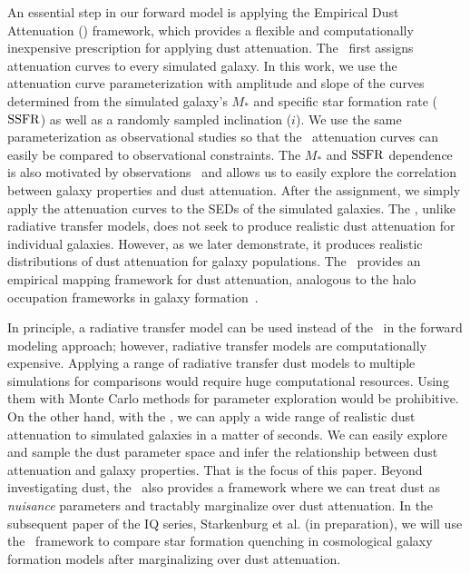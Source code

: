 An essential step in our forward model is applying the Empirical Dust
Attenuation (\eda) framework, which provides a flexible and computationally
inexpensive prescription for applying dust attenuation.  
The \eda~first assigns attenuation curves to every simulated galaxy. 
In this work, we use the \cite{noll2009} attenuation curve parameterization
with amplitude and slope of the curves determined from
the simulated galaxy's $M_*$ and specific star formation
rate (${\rm SSFR}$) as well as a randomly sampled inclination ($i$). 
We use the same parameterization as observational studies so that the
\eda~attenuation curves can easily be compared to observational constraints. 
The $M_*$ and ${\rm SSFR}$ dependence is also motivated by
observations~\citep[\eg~][]{garn2010, wild2011, battisti2016, leja2017,
salim2018, salim2020} and allows us to easily explore the correlation
between galaxy properties and dust attenuation.
After the assignment, we simply apply the attenuation curves to the SEDs of
the simulated galaxies.
The \eda, unlike radiative transfer models, does not seek to produce realistic
dust attenuation for individual galaxies. 
However, as we later demonstrate, it produces realistic distributions of
dust attenuation for galaxy populations. 
The \eda~provides an empirical mapping framework for dust attenuation,
analogous to the halo occupation frameworks in galaxy formation~\citep[for a
review see ][]{wechsler2018}. 

In principle, a radiative transfer model can be used instead of the \eda~in
the forward modeling approach; however, radiative transfer models are computationally expensive.  
Applying a range of radiative transfer dust models to multiple simulations
for comparisons would require huge computational resources.
Using them with Monte Carlo methods for parameter exploration would be
prohibitive.  
On the other hand, with the \eda, we can apply a wide range of realistic
dust attenuation to simulated galaxies in a matter of seconds. 
We can easily explore and sample the dust parameter space and infer the
relationship between dust attenuation and galaxy properties. 
That is the focus of this paper. 
Beyond investigating dust, the \eda~also provides a framework where we can
treat dust as {\em nuisance} parameters and tractably marginalize over dust
attenuation. 
In the subsequent paper of the IQ series, Starkenburg et al. (in
preparation), we will use the \eda~framework to compare star formation
quenching in cosmological galaxy formation models after marginalizing over
dust attenuation. 

